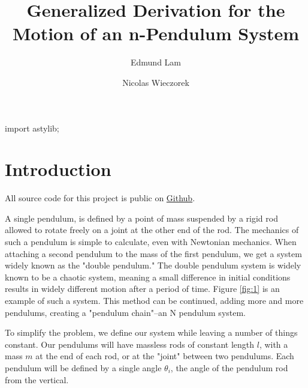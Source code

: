 \documentclass{article}
\title{Generalized Derivation for the Motion of an n-Pendulum System}
\author{Edmund Lam \and Nicolas Wieczorek}
\begin{document}
\begin{titlepage}
	\maketitle
	\thispagestyle{empty}
\end{titlepage}
\newpage
  \tableofcontents
\newpage

\begin{asydef}
import astylib;
\end{asydef}

\section{Introduction}
All source code for this project is public on \href{https://github.com/UnsignedByte/n-pendulums}{Github}.

A single pendulum, is defined by a point of mass suspended by a rigid rod allowed to rotate freely on a joint at the other end of the rod. The mechanics of such a pendulum is simple to calculate, even with Newtonian mechanics. When attaching a second pendulum to the mass of the first pendulum, we get a system widely known as the "double pendulum." The double pendulum system is widely known to be a chaotic system, meaning a small difference in initial conditions results in widely different motion after a period of time. Figure \ref{fig:1} is an example of such a system. This method can be continued, adding more and more pendulums, creating a "pendulum chain"--an N pendulum system.

To simplify the problem, we define our system while leaving a number of things constant. Our pendulums will have massless rods of constant length $l$, with a mass $m$ at the end of each rod, or at the "joint" between two pendulums. Each pendulum will be defined by a single angle $\theta_i$, the angle of the pendulum rod from the vertical. 
\end{document}
